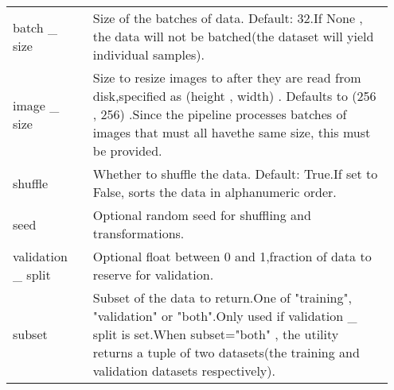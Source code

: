\documentclass[
	letterpaper, %
	10pt, %
	unnumberedsections, %
	twoside, %
]{LTJournalArticle}
\begin{document}
\begin{table*}[ht!]
\begin{tabular}{L{0.2\linewidth} L{0.75\linewidth}}
        batch \_ size                 & Size of the batches of data. Default: 32.If None , the data will not be batched(the dataset will yield individual samples).                                                                                                                                                                                                                                                                                                              \\
        image \_ size                 & Size to resize images to after they are read from disk,specified as (height , width) . Defaults to (256 , 256) .Since the pipeline processes batches of images that must all havethe same size, this must be provided.                                                                                                                                                                                                                   \\
        shuffle                       & Whether to shuffle the data. Default: True.If set to False, sorts the data in alphanumeric order.                                                                                                                                                                                                                                                                                                                                        \\
        seed                          & Optional random seed for shuffling and transformations.                                                                                                                                                                                                                                                                                                                                                                                  \\
        validation \_ split           & Optional float between 0 and 1,fraction of data to reserve for validation.                                                                                                                                                                                                                                                                                                                                                               \\
        subset                        & Subset of the data to return.One of "training", "validation" or "both".Only used if validation \_ split is set.When subset="both" , the utility returns a tuple of two datasets(the training and validation datasets respectively).                                                                                                                                                                                                      \\

\end{tabular}
\end{table*}
\end{document}
